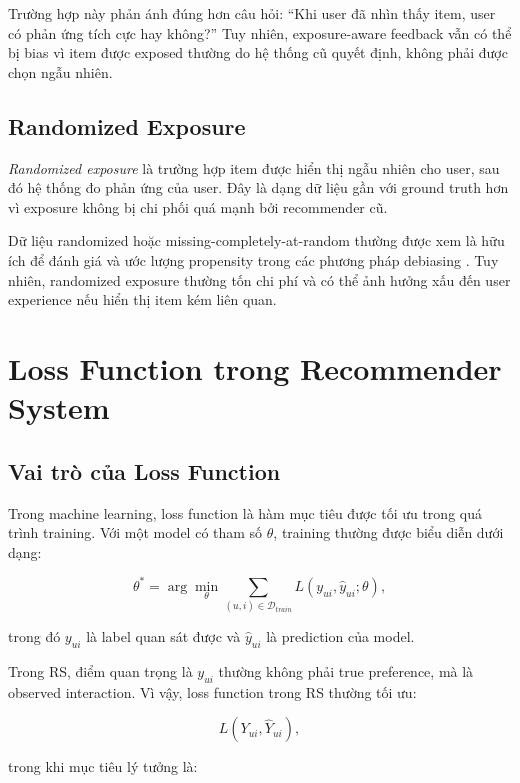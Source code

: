 \documentclass[12pt,a4paper]{article}
\begin{document}
Trường hợp này phản ánh đúng hơn câu hỏi: ``Khi user đã nhìn thấy item, user có phản ứng tích cực hay không?'' Tuy nhiên, exposure-aware feedback vẫn có thể bị bias vì item được exposed thường do hệ thống cũ quyết định, không phải được chọn ngẫu nhiên.

\subsection{Randomized Exposure}

\textit{Randomized exposure} là trường hợp item được hiển thị ngẫu nhiên cho user, sau đó hệ thống đo phản ứng của user. Đây là dạng dữ liệu gần với ground truth hơn vì exposure không bị chi phối quá mạnh bởi recommender cũ.

Dữ liệu randomized hoặc missing-completely-at-random thường được xem là hữu ích để đánh giá và ước lượng propensity trong các phương pháp debiasing \cite{schnabel2016recommendations}. Tuy nhiên, randomized exposure thường tốn chi phí và có thể ảnh hưởng xấu đến user experience nếu hiển thị item kém liên quan.

\section{Loss Function trong Recommender System}

\subsection{Vai trò của Loss Function}

Trong machine learning, loss function là hàm mục tiêu được tối ưu trong quá trình training. Với một model có tham số $\theta$, training thường được biểu diễn dưới dạng:

\begin{equation}
\theta^* = \arg\min_{\theta} \sum_{(u,i) \in \mathcal{D}_{train}} L(y_{ui}, \hat{y}_{ui}; \theta),
\end{equation}

trong đó $y_{ui}$ là label quan sát được và $\hat{y}_{ui}$ là prediction của model.

Trong RS, điểm quan trọng là $y_{ui}$ thường không phải true preference, mà là observed interaction. Vì vậy, loss function trong RS thường tối ưu:

\begin{equation}
L(Y_{ui}, \hat{Y}_{ui}),
\end{equation}

trong khi mục tiêu lý tưởng là:
\end{document}
